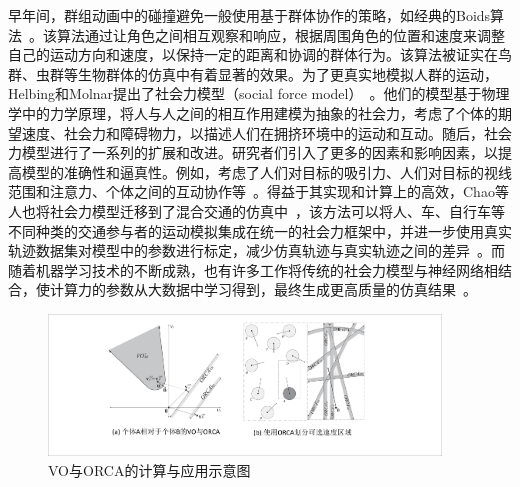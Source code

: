 早年间，群组动画中的碰撞避免一般使用基于群体协作的策略，如经典的Boids算法~\cite{reynolds1987flocks, reynolds1999steering}。该算法通过让角色之间相互观察和响应，根据周围角色的位置和速度来调整自己的运动方向和速度，以保持一定的距离和协调的群体行为。该算法被证实在鸟群、虫群等生物群体的仿真中有着显著的效果。为了更真实地模拟人群的运动，Helbing和Molnar提出了社会力模型（social force model）~\cite{helbing1995social}。他们的模型基于物理学中的力学原理，将人与人之间的相互作用建模为抽象的社会力，考虑了个体的期望速度、社会力和障碍物力，以描述人们在拥挤环境中的运动和互动。随后，社会力模型进行了一系列的扩展和改进。研究者们引入了更多的因素和影响因素，以提高模型的准确性和逼真性。例如，考虑了人们对目标的吸引力、人们对目标的视线范围和注意力、个体之间的互动协作等~\cite{helbing2000simulating, zanlungo2011social, yang2014guided, li2021force}。得益于其实现和计算上的高效，Chao等人也将社会力模型迁移到了混合交通的仿真中~\cite{chao2019force}，该方法可以将人、车、自行车等不同种类的交通参与者的运动模拟集成在统一的社会力框架中，并进一步使用真实轨迹数据集对模型中的参数进行标定，减少仿真轨迹与真实轨迹之间的差异~\cite{chao2021calibrated}。而随着机器学习技术的不断成熟，也有许多工作将传统的社会力模型与神经网络相结合，使计算力的参数从大数据中学习得到，最终生成更高质量的仿真结果~\cite{li2019simulation, kreiss2021deep, yue2022human}。

\begin{figure}[!b]
\centering
\includegraphics[width=0.93\textwidth]{figure/intro/orca v2.pdf}
\caption[VO与ORCA的计算与应用示意图]{
VO与ORCA的计算与应用示意图
}
\label{fig:intro_orca}
\end{figure}


